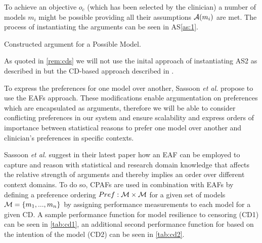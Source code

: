 To achieve an objective $o_c$ (which has been selected by the clinician) a number of models $m_i$ might be possible providing all their assumptions $\mathcal{A}(m_i)$ are met. The process of instantiating the arguments can be seen in AS\autoref{as:1}.

\begin{as}[h]
\centering
	\caption{Constructed argument for a Possible Model.\label{as:1}}
\end{as}

As quoted in \autoref{rem:cds} we will not use the inital approach of instantiating AS2 as described in \cite{sassoon2014} but the \gls{CD}-based approach described in \cite{sassoon2016CD}.

To express the preferences for one model over another, Sassoon \textit{et al.} \cite{sassoon2016} propose to use the \glspl{EAF} \cite{Modgil2009} approach. These modifications enable argumentation on preferences which are encapsulated as arguments, therefore we will be able to consider conflicting preferences in our system and ensure scalability and express orders of importance between statistical reasons to prefer one model over another and clinician's preferences in specific contexts.

Sassoon \textit{et al.} suggest in their latest paper \cite{sassoon2016CD} how an \gls{EAF} can be employed to capture and reason with statistical and research domain knowledge that affects the relative strength of arguments and thereby implies an order over different context domains. To do so, \glspl{CPAF} are used in combination with \glspl{EAF} by defining a preference ordering $Pref : \mathcal{M} \times \mathcal{M}$ for a given set of models $\mathcal{M} = \{m_1, ..., m_n\}$ by assigning performance measurements to each model for a given \gls{CD}. A sample performance function for model resilience to censoring (CD1) can be seen in \autoref{tab:cd1}, an additional second performance function for based on the intention of the model (CD2) can be seen in \autoref{tab:cd2}.


